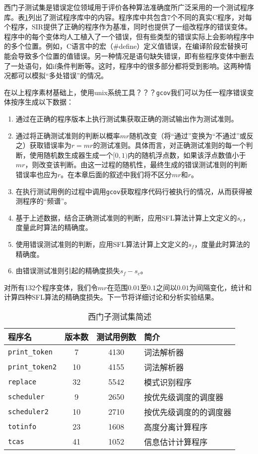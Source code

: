 西门子测试集是错误定位领域用于评价各种算法准确度所广泛采用的一个测试程序库。表\ref{Tab: Siemens}列出了测试程序库中的内容。程序库中共包含7个不同的真实C程序，对每个程序，SIR提供了正确的程序作为基准，同时也提供了一组改程序的错误变体。程序中的每个变体均人工植入了一个错误，但有些类型的错误实际上会影响程序中的多个位置。例如，C语言中的宏（\#define）定义值错误，在编译阶段宏替换可能会导致多个位置的值错误。另一种情况是语句缺失错误，即有些程序变体中删去了一处语句，如if条件判断等。这时，程序中的很多部分都将受到影响。这两种情况都可以模拟“多处错误”的情况。

在以上程序素材基础上，使用unix系统工具？？？\texttt{gcov}我们可以为任一程序错误变体按序生成以下数据：
\begin{enumerate}
	\setlength{\itemsep}{0pt}
	\setlength{\parskip}{0pt}
	\setcounter{enumi}{0}
	\item 通过在正确的程序版本上执行测试集获取正确的测试输出作为测试准则。
	\item 通过将正确测试准则的判断以概率$mr$随机改变（将“通过”变换为“不通过”或反之）获取错误率为$r = mr$的测试准则。具体而言，对正确测试准则的每一个判断，使用随机数生成器生成一个$[0,1)$内的随机浮点数，如果该浮点数值小于$mr$，则改变该判断。由这一过程的随机性，最终生成的错误测试准则的判断错误率也应为$r$。在本章后面的叙述中我们将不区分$mr$和$r$。
	\item 在执行测试用例的过程中调用\texttt{gcov}获取程序代码行被执行的情况，从而获得被测程序的“频谱”。
	\item 基于上述数据，结合正确测试准则的判断，应用SFL算法计算上文定义的$s_c$，度量此时算法的精确度。
	\item 使用错误测试准则的判断，应用SFL算法计算上文定义的$s_f$，度量此时算法的精确度。
	\item 由错误测试准则引起的精确度损失$s_f - s_c$。
\end{enumerate}

对所有132个程序变体，我们令$mr$在范围$0.01$至$0.1$之间以$0.01$为间隔变化，统计和计算四种SFL算法的精确度损失。下一节将详细讨论和分析实验结果。

\begin{table}
	\caption{西门子测试集简述}\label{Tab: Siemens}
	\centering
	\begin{tabular}{l|c|c|l}
		\hline 程序名                & 版本数 & 测试用例数      & 简介 \\ 
		\hline \texttt{print\_token}  & 7        & 4130       & 词法解析器 \\ 
		\hline \texttt{print\_token2} & 10       & 4155       & 词法解析器\\
		\hline \texttt{replace}       & 32       & 5542       & 模式识别程序\\ 
		\hline \texttt{scheduler}     & 9        & 2650       & 按优先级调度的调度器 \\ 
		\hline \texttt{scheduler2}    & 10       & 2710       & 按优先级调度的的调度器 \\ 
		\hline \texttt{totinfo}       & 23       & 1608       & 高度分离计算程序 \\ 
		\hline \texttt{tcas}          & 41       & 1052       & 信息估计计算程序 \\ 
		\hline 
	\end{tabular}
\end{table}

